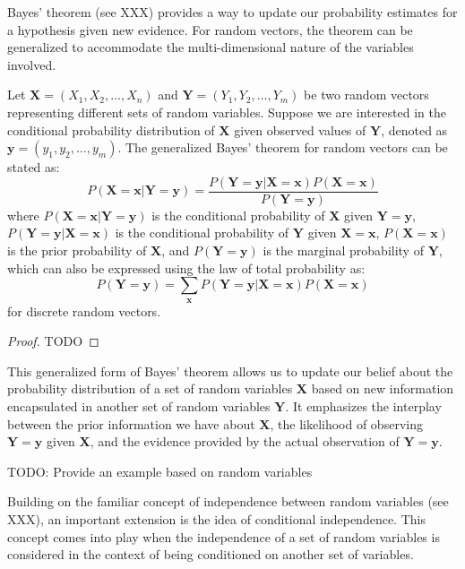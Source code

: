 Bayes' theorem (see {\color{red} XXX}) provides a way to update our probability estimates for a hypothesis given new evidence. For random vectors, the theorem can be generalized to accommodate the multi-dimensional nature of the variables involved. 

\begin{theorem}
Let $\mathbf{X} = (X_1, X_2, \ldots, X_n)$ and $\mathbf{Y} = (Y_1, Y_2, \ldots, Y_m)$ be two random vectors representing different sets of random variables. Suppose we are interested in the conditional probability distribution of $\mathbf{X}$ given observed values of $\mathbf{Y}$, denoted as $\mathbf{y} = (y_1, y_2, \ldots, y_m)$. The generalized Bayes' theorem for random vectors can be stated as:
\[
P(\mathbf{X}=\mathbf{x}|\mathbf{Y}=\mathbf{y}) = \frac{P(\mathbf{Y}=\mathbf{y}|\mathbf{X}=\mathbf{x})P(\mathbf{X}=\mathbf{x})}{P(\mathbf{Y}=\mathbf{y})}
\]
where $P(\mathbf{X}=\mathbf{x}|\mathbf{Y}=\mathbf{y})$ is the conditional probability of $\mathbf{X}$ given $\mathbf{Y}=\mathbf{y}$, $P(\mathbf{Y}=\mathbf{y}|\mathbf{X}=\mathbf{x})$ is the conditional probability of $\mathbf{Y}$ given $\mathbf{X}=\mathbf{x}$,  $P(\mathbf{X}=\mathbf{x})$ is the prior probability of $\mathbf{X}$, and $P(\mathbf{Y}=\mathbf{y})$ is the marginal probability of $\mathbf{Y}$, which can also be expressed using the law of total probability as:
\[
P(\mathbf{Y}=\mathbf{y}) = \sum_{\mathbf{x}} P(\mathbf{Y}=\mathbf{y}|\mathbf{X}=\mathbf{x})P(\mathbf{X}=\mathbf{x})
\]
for discrete random vectors.
\end{theorem}
\begin{proof}
{\color{red} TODO}
\end{proof}

This generalized form of Bayes' theorem allows us to update our belief about the probability distribution of a set of random variables $\mathbf{X}$ based on new information encapsulated in another set of random variables $\mathbf{Y}$. It emphasizes the interplay between the prior information we have about $\mathbf{X}$, the likelihood of observing $\mathbf{Y}=\mathbf{y}$ given $\mathbf{X}$, and the evidence provided by the actual observation of $\mathbf{Y}=\mathbf{y}$.

\begin{example}
{\color{red} TODO: Provide an example based on random variables}
\end{example}

Building on the familiar concept of independence between random variables (see {\color{red} XXX}), an important extension is the idea of conditional independence. This concept comes into play when the independence of a set of random variables is considered in the context of being conditioned on another set of variables.


